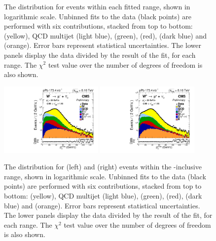 \begin{figure}[htb!]
\begin{tiny}
\end{tiny}
\caption{The \ptmiss distribution for \WToMuNuPl events within each fitted \etaMuCM range, shown in logarithmic scale. Unbinned fits to the data (black points) are performed with six contributions, stacked from top to bottom: \WToMuNuPl (yellow), QCD multijet (light blue), \DYToMuMu (green), \WToTauNuPl (red), \DYToTauTau (dark blue) and \ttbar (orange). Error bars represent statistical uncertainties. The lower panels display the data divided by the result of the fit, for each \etaMuCM range. The $\chi^{2}$ test value over the number of degrees of freedom is also shown.}
\label{fig:METFits_WToMuPl_PA}
 
\end{figure}


\begin{figure}[htb!]
\centering
\begin{tiny}
\includegraphics[width=0.45\textwidth]{Figures/WBoson/Analysis/SignalExtraction/Signal/LOG/PLOT_MET_DATA_WToMuMi_PA_Model_TEMP_WDYDYToTauWToTauTTbar_ModifiedRayleigh_QCD_MuEtaCM_-286_193_MuIso_0_15.pdf}
\includegraphics[width=0.45\textwidth]{Figures/WBoson/Analysis/SignalExtraction/Signal/LOG/PLOT_MET_DATA_WToMuPl_PA_Model_TEMP_WDYDYToTauWToTauTTbar_ModifiedRayleigh_QCD_MuEtaCM_-286_193_MuIso_0_15.pdf}
\end{tiny}
\caption{The \ptmiss distribution for \WToMuNuPl (left) and \WToMuNuMi (right) events within the \etaMuCM-inclusive range, shown in logarithmic scale. Unbinned fits to the data (black points) are performed with six contributions, stacked from top to bottom: \WToMuNu (yellow), QCD multijet (light blue), \DYToMuMu (green), \WToTauNu (red), \DYToTauTau (dark blue) and \ttbar (orange). Error bars represent statistical uncertainties. The lower panels display the data divided by the result of the fit, for each \etaMuCM range. The $\chi^{2}$ test value over the number of degrees of freedom is also shown.}
\label{fig:METFits_WToMuPl_PA_Inc}
 
\end{figure}
